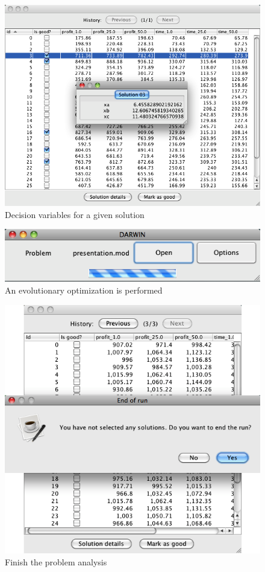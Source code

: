 \begin{figure}
  \centering
  \includegraphics[scale=0.7]{img/manual/05_solution_details}
  \caption{Decision variables for a given solution}
  \label{manual_05_dec_var}
\end{figure}

\begin{figure}
  \centering
  \includegraphics[scale=0.7]{img/manual/06_evolutionary_loop}
  \caption{An evolutionary optimization is performed}
  \label{manual_06_evo_loop}
\end{figure}

\begin{figure}
  \centering
  \includegraphics[scale=0.7]{img/manual/07_end_of_run}
  \caption{Finish the problem analysis}
  \label{manual_07_finish}
\end{figure}

